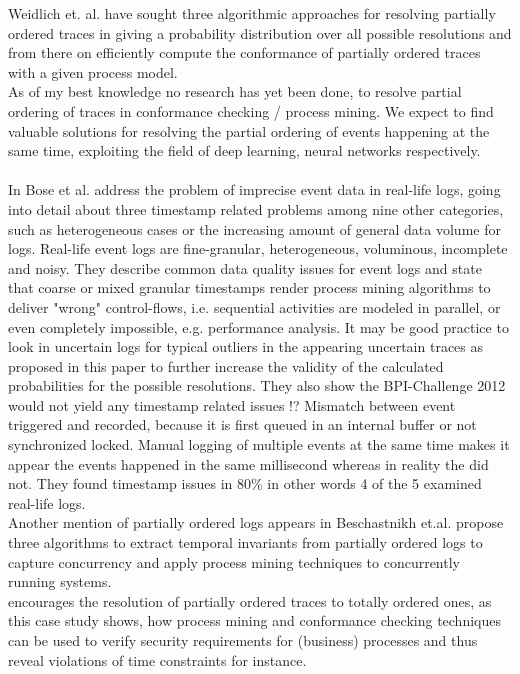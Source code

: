 \documentclass[
	a4paper,
	pagesize,
	pdftex,
	12pt,
	ngerman,
	fleqn,
	final,
	]{scrartcl}
\theoremstyle{plain}
\theoremstyle{definition}
\begin{document}
	Weidlich et. al. have sought three algorithmic approaches for resolving partially ordered traces in giving a probability distribution over all possible resolutions and from there on efficiently compute the conformance of partially ordered traces with a given process model.\cite{self} \\
	As of my best knowledge no research has yet been done, to resolve partial ordering of traces in conformance checking / process mining. We expect to find valuable solutions for resolving the partial ordering of events happening at the same time, exploiting the field of deep learning, neural networks respectively. \\
	\\
	In \cite{bose2013wanna} Bose et al. address the problem of imprecise event data in real-life logs, going into detail about three timestamp related problems among nine other categories, such as heterogeneous cases or the increasing amount of general data volume for logs.  Real-life event logs are fine-granular, heterogeneous, voluminous, incomplete and noisy. They describe common data quality issues for event logs and state that coarse or mixed granular timestamps render process mining algorithms to deliver "wrong" control-flows, i.e. sequential activities are modeled in parallel, or even completely impossible, e.g. performance analysis. It may be good practice to look in uncertain logs for typical outliers in the appearing uncertain traces as proposed in this paper to further increase the validity of the calculated probabilities for the possible resolutions. They also show the BPI-Challenge 2012 would not yield any timestamp related issues !? Mismatch between event triggered and recorded, because it is first queued in an internal buffer or not synchronized locked. Manual logging of multiple events at the same time makes it appear the events happened in the same millisecond whereas in reality the did not. They found timestamp issues in 80\% in other words 4 of the 5 examined real-life logs.\\
	Another mention of partially ordered logs appears in \cite{beschastnikh2011mining} Beschastnikh et.al. propose three algorithms to extract temporal invariants from partially ordered logs to capture concurrency and apply process mining techniques to concurrently running systems. \\ 
	\cite{accorsi2012exploitation} encourages the resolution of partially ordered traces to totally ordered ones, as this case study shows, how process mining and conformance checking techniques can be used to verify security requirements for (business) processes and thus reveal violations of time constraints for instance. \\
\end{document}
